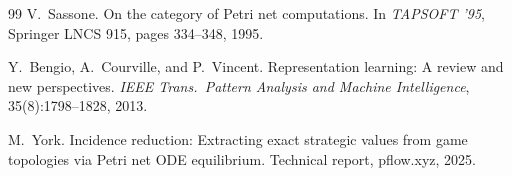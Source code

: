 \documentclass[11pt,a4paper]{article}
\begin{document}
\begin{thebibliography}{99}
V.~Sassone.
\newblock On the category of {P}etri net computations.
\newblock In {\em TAPSOFT '95}, Springer LNCS 915, pages 334--348, 1995.

Y.~Bengio, A.~Courville, and P.~Vincent.
\newblock Representation learning: A review and new perspectives.
\newblock \emph{IEEE Trans.\ Pattern Analysis and Machine Intelligence}, 35(8):1798--1828, 2013.

M.~York.
\newblock Incidence reduction: Extracting exact strategic values from game topologies via {P}etri net {ODE} equilibrium.
\newblock Technical report, pflow.xyz, 2025.

\end{thebibliography}
\end{document}
